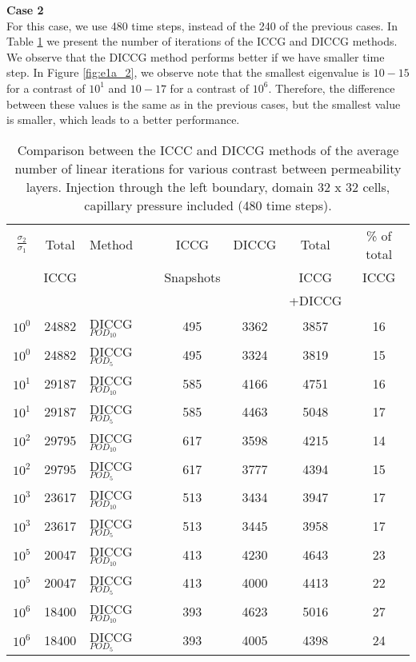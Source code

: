 \documentclass[12pt]{article}
\begin{document}
\newpage
\textbf{Case 2 }\\
For this case, we use 480 time steps, instead of the 240 of the previous cases. In Table \ref{table:liter1a_2} we present the number of iterations of the ICCG and DICCG methods. We observe that the DICCG method performs better if we have smaller time step. In Figure \ref{fig:e1a_2}, we observe note that the  smallest eigenvalue is $10-15$ for a contrast of $10^1$ and $10-17$ for a contrast of $10^6$. Therefore, the difference between these values is the same as in the previous cases, but the smallest value is smaller, which leads to a better performance.
\begin{table}[!h]\centering
\begin{minipage}{1\textwidth}
 \centering
\begin{tabular}{ ||c|c||l|c|c|c|c||} 
\hline
$\frac{\sigma_2}{\sigma_1}$&Total&Method  & ICCG&DICCG &Total&\% of total\\ 
                           & ICCG     &  & Snapshots& &ICCG& ICCG\\ 
                            &     &  & & &+DICCG& \\
\hline  
$10^{0}$ &24882& DICCG$_{POD_{10}}$&495&3362&3857&16 \\ 
\hline  
$10^{0}$ &24882& DICCG$_{POD_{5}}$&495&3324&3819&15 \\ 
\hline  
$10^{1}$ &29187& DICCG$_{POD_{10}}$&585&4166&4751&16 \\ 
\hline  
$10^{1}$ &29187& DICCG$_{POD_{5}}$&585&4463&5048&17 \\ 
\hline 
$10^{2}$ &29795& DICCG$_{POD_{10}}$&617&3598&4215&14 \\ 
\hline  
$10^{2}$ &29795& DICCG$_{POD_{5}}$&617&3777&4394&15 \\ 
\hline  
$10^{3}$ &23617& DICCG$_{POD_{10}}$&513&3434&3947&17 \\ 
\hline  
$10^{3}$ &23617& DICCG$_{POD_{5}}$&513&3445&3958&17 \\ 
\hline  
$10^{5}$ &20047& DICCG$_{POD_{10}}$&413&4230&4643&23 \\ 
\hline  
$10^{5}$ &20047& DICCG$_{POD_{5}}$&413&4000&4413&22 \\ 
\hline  
$10^{6}$ &18400& DICCG$_{POD_{10}}$&393&4623&5016&27 \\ 
\hline  
$10^{6}$ &18400& DICCG$_{POD_{5}}$&393&4005&4398&24 \\ 
\hline  
\end{tabular} 
\caption{Comparison between the ICCC and DICCG methods of the average number of linear iterations for various contrast between permeability layers. Injection through the left boundary, domain 32 x 32 cells, capillary pressure included (480 time steps).}\label{table:liter1a_2} 
\end{minipage}  
\end{table}  
\end{document}
